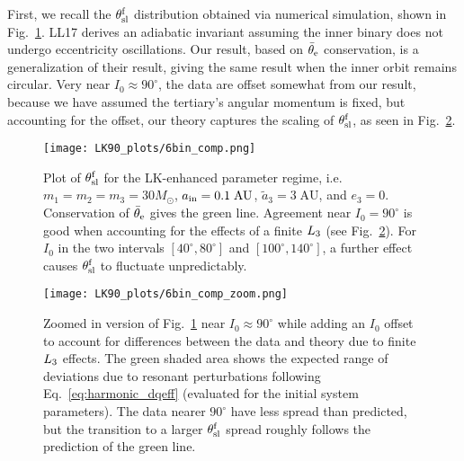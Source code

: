 \documentclass[
        twocolumn,
        twocolappendix
    ]{aastex63}
\begin{document}
First, we recall the $\theta_{\rm sl}^{\rm f}$ distribution obtained via
numerical simulation, shown in Fig.~\ref{fig:bin_comp}. LL17 derives an
adiabatic invariant assuming the inner binary does not undergo eccentricity
oscillations. Our result, based on $\bar{\theta}_{\rm e}$ conservation, is a
generalization of their result, giving the same result when the inner orbit
remains circular. Very near $I_0 \approx 90^\circ$, the data are offset somewhat
from our result, because we have assumed the tertiary's angular momentum is
fixed, but accounting for the offset, our theory captures the scaling of
$\theta_{\rm sl}^{\rm f}$, as seen in Fig.~\ref{fig:bin_comp_zoom}.

\begin{figure}
    \centering
    \texttt{[image: LK90\_plots/6bin\_comp.png]}
    \caption{Plot of $\theta_{\rm sl}^{\rm f}$ for the LK-enhanced parameter
    regime, i.e.\ $m_1 = m_2 = m_3 = 30M_{\odot}$,
    $a_{\rm in} = 0.1\;\mathrm{AU}$, $\tilde{a}_3 = 3\;\mathrm{AU}$, and $e_3
    = 0$. Conservation of $\bar{\theta}_{\rm e}$ gives the green line. Agreement near
    $I_0 = 90^\circ$ is good when accounting for the effects of a finite
    $L_{\rm 3}$ (see Fig.~\ref{fig:bin_comp_zoom}). For $I_0$ in the two
    intervals $[40^\circ, 80^\circ]$ and $[100^\circ, 140^\circ]$, a further
    effect causes $\theta_{\rm sl}^{\rm f}$ to fluctuate
    unpredictably.}\label{fig:bin_comp}
\end{figure}

\begin{figure}
    \centering
    \texttt{[image: LK90\_plots/6bin\_comp\_zoom.png]}
    \caption{Zoomed in version of Fig.~\ref{fig:bin_comp} near $I_0 \approx
    90^\circ$ while adding an $I_0$ offset to account for differences between
    the data and theory due to finite $L_{\rm 3}$ effects. The green shaded
    area shows the expected range of deviations due to resonant perturbations
    following Eq.~\eqref{eq:harmonic_dqeff} (evaluated for the initial system
    parameters). The data nearer $90^\circ$ have less spread than predicted, but
    the transition to a larger $\theta_{\rm sl}^{\rm f}$ spread roughly follows
    the prediction of the green line.}\label{fig:bin_comp_zoom}
\end{figure}
\end{document}
